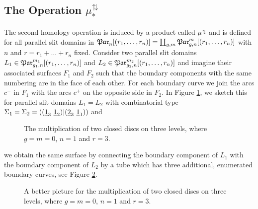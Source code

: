 \subsection{The Operation \texorpdfstring{$\mu^{\updownarrows}_\ast$}{muupdownarrows*}}
\label{homology_operations:parallel_patching_slit_pics:construction_of_mu_updownarrows}
The second homology operation is induced by a product called $\mu^{\updownarrows}$
and is defined for all parallel slit domains in $\Par_n[(r_1, \ldots, r_n)] = \coprod_{g,m} \Par_{g,n}^m[(r_1, \ldots, r_n)]$ with $n$ and $r=r_1 + \ldots + r_n$ fixed.
Consider two parallel slit domains $L_1 \in \Par_{g_1,n}^{m_1}[(r_1, \ldots, r_n)]$ and $L_2 \in \Par_{g_2,n}^{m_2}[(r_1, \ldots, r_n)]$
and imagine their associated surfaces $F_1$ and $F_2$ such that the boundary components with the same numbering are in the face of each other.
For each boundary curve we join the arcs $c^-$ in $F_1$ with the arcs $c^+$ on the opposite side in $F_2$.
In Figure \ref{homology_operations:parallel_patching_slit_pics:parallel_mutliplication_three_slit_pictures}, we sketch this for parallel slit domains $L_1 = L_2$
with combinatorial type $\Sigma_1 = \Sigma_2 = ((\underline{\smash{1}}_3\ \underline{\smash{1}}_2) | (\underline{\smash{2}}_3\ \underline{\smash{1}}_1))$ and
\begin{figure}[ht]
    \centering
    
    \def\svgwidth{.5\columnwidth}
    \raisebox{-0.5\height}{}
    \hspace{10pt}
    \def\svgwidth{.3\columnwidth}
    \raisebox{-0.5\height}{}
    \caption{
        \label{homology_operations:parallel_patching_slit_pics:parallel_mutliplication_three_slit_pictures}
        The multiplication of two closed discs on three levels, where $g=m=0$, $n=1$ and $r=3$.}
\end{figure}
we obtain the same surface by connecting the boundary component of $L_1$ with the boundary component of $L_2$ by a tube which has three additional, enumerated boundary curves,
see Figure \ref{homology_operations:parallel_patching_slit_pics:parallel_mutliplication_glueing_with_handle}.
\begin{figure}[ht]
    \centering
    \def\svgwidth{.5\columnwidth}
    
    \caption{
        \label{homology_operations:parallel_patching_slit_pics:parallel_mutliplication_glueing_with_handle}
        A better picture for the multiplication of two closed discs on three levels, where $g=m=0$, $n=1$ and $r=3$.}
\end{figure}
